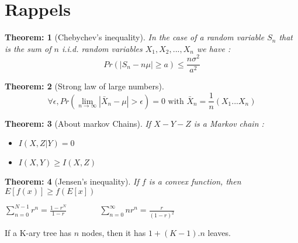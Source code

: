 \documentclass[11pt, a4paper]{scrartcl}
\newtheorem{theorem}{Theorem:}[section]
\newenvironment{remark}[1][Remark]{\begin{trivlist}
\item[\hskip \labelsep {\bfseries #1}]}{\end{trivlist}}
\begin{document}
\section{Rappels}
\begin{theorem} [Chebychev's inequality]
In the case of a random variable $S_n$ that is the sum of $n$ i.i.d. random variables
$X_1,X_2,..., X_n$ we have : $$Pr(|S_n -n\mu|\geq a) \leq \frac{n\sigma^2}{a^2} $$
\end{theorem}

\begin{theorem} [Strong law of large numbers]
$$\forall \epsilon, Pr(\lim_{n \to \infty} |\bar X_n - \mu | > \epsilon) = 0 \text{ with } \bar X_n = \frac1n (X_1...X_n)$$
\end{theorem}

\begin{theorem} [About markov Chains] If $X-Y-Z$ is a Markov chain : 
\begin{itemize}
\item $I(X, Z|Y) = 0$
\item $I(X, Y) \geq I(X, Z)$
\end{itemize}
\end{theorem}

\begin{theorem}[Jensen's inequality] 
If $f$ is a convex function, then $E[f(x)]\geq f(E[x])$
\end{theorem}

\begin{remark}[Sums] $\displaystyle \sum_{n=0}^{N-1} r^n = \frac{1-r^N}{1-r} \qquad   \qquad  \sum_{n=0}^{\infty} nr^n = \frac{r}{(1-r)^2} $
\end{remark}

\begin{remark}[K-ary tree] If a K-ary tree has $n$ nodes, then it has $1+(K-1).n$ leaves. 
\end{remark}
\end{document}
